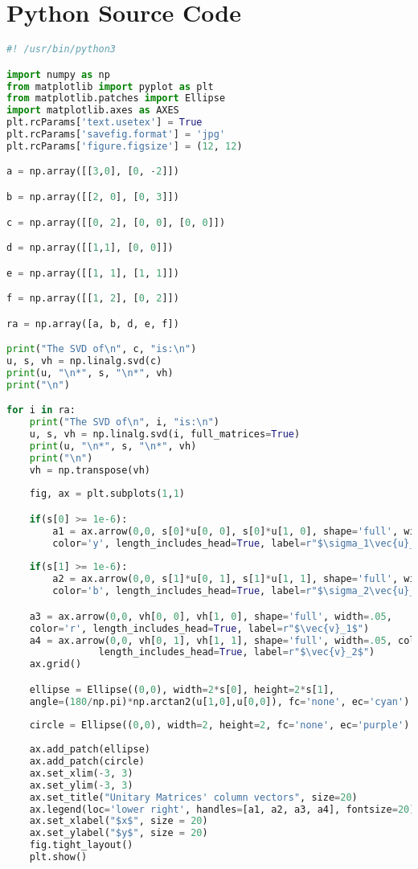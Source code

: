 \documentclass{article}
\begin{document}
\section*{Python Source Code}
\begin{lstlisting}[language=Python]
#! /usr/bin/python3

import numpy as np
from matplotlib import pyplot as plt
from matplotlib.patches import Ellipse 
import matplotlib.axes as AXES
plt.rcParams['text.usetex'] = True
plt.rcParams['savefig.format'] = 'jpg'
plt.rcParams['figure.figsize'] = (12, 12)

a = np.array([[3,0], [0, -2]])

b = np.array([[2, 0], [0, 3]])

c = np.array([[0, 2], [0, 0], [0, 0]])

d = np.array([[1,1], [0, 0]])

e = np.array([[1, 1], [1, 1]])

f = np.array([[1, 2], [0, 2]])

ra = np.array([a, b, d, e, f])

print("The SVD of\n", c, "is:\n")
u, s, vh = np.linalg.svd(c)
print(u, "\n*", s, "\n*", vh)
print("\n")

for i in ra:
	print("The SVD of\n", i, "is:\n")
	u, s, vh = np.linalg.svd(i, full_matrices=True)
	print(u, "\n*", s, "\n*", vh)
	print("\n")
	vh = np.transpose(vh)
	
	fig, ax = plt.subplots(1,1)

	if(s[0] >= 1e-6):
		a1 = ax.arrow(0,0, s[0]*u[0, 0], s[0]*u[1, 0], shape='full', width=.05, 
		color='y', length_includes_head=True, label=r"$\sigma_1\vec{u}_1$")
		
	if(s[1] >= 1e-6):
		a2 = ax.arrow(0,0, s[1]*u[0, 1], s[1]*u[1, 1], shape='full', width=.05, 
		color='b', length_includes_head=True, label=r"$\sigma_2\vec{u}_2$")

	a3 = ax.arrow(0,0, vh[0, 0], vh[1, 0], shape='full', width=.05, 
	color='r', length_includes_head=True, label=r"$\vec{v}_1$")
	a4 = ax.arrow(0,0, vh[0, 1], vh[1, 1], shape='full', width=.05, color='g', 
				length_includes_head=True, label=r"$\vec{v}_2$")
	ax.grid()

	ellipse = Ellipse((0,0), width=2*s[0], height=2*s[1], 
	angle=(180/np.pi)*np.arctan2(u[1,0],u[0,0]), fc='none', ec='cyan')
	
	circle = Ellipse((0,0), width=2, height=2, fc='none', ec='purple')
	
	ax.add_patch(ellipse)
	ax.add_patch(circle)
	ax.set_xlim(-3, 3)
	ax.set_ylim(-3, 3)
	ax.set_title("Unitary Matrices' column vectors", size=20)
	ax.legend(loc='lower right', handles=[a1, a2, a3, a4], fontsize=20)
	ax.set_xlabel("$x$", size = 20)
	ax.set_ylabel("$y$", size = 20)
	fig.tight_layout()
	plt.show()
\end{lstlisting}
\noindent\makebox[\linewidth]{\rule{\paperwidth}{0.4pt}}
\end{document}
